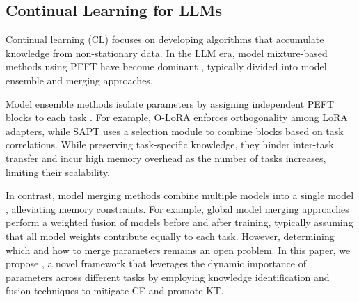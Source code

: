 \subsection{Continual Learning for LLMs}
Continual learning (CL) \cite{zhou2024continual} focuses on developing algorithms that accumulate knowledge from non-stationary data. In the LLM era, model mixture-based methods using PEFT have become dominant \cite{wang2023rehearsal, huang2024mitigating, wang2024inscl}, typically divided into model ensemble and merging approaches.

Model ensemble methods isolate parameters by assigning independent PEFT blocks to each task \cite{feng2023towards, pham2023continual, ke2023sub, li2024revisiting, he2024seekr, wang2024self}. For example, O-LoRA \cite{wang2023orthogonal} enforces orthogonality among LoRA adapters, while SAPT \cite{zhao2024sapt} uses a selection module to combine blocks based on task correlations. 
While preserving task-specific knowledge, they hinder inter-task transfer and incur high memory overhead as the number of tasks increases, limiting their scalability.

In contrast, model merging methods combine multiple models into a single model \cite{cheng2024dam, alexandrov2024mitigating, ren2024analyzing}, alleviating memory constraints.
For example, global model merging approaches \cite{wortsman2022model, ilharco2023editing} perform a weighted fusion of models before and after training, typically assuming that all model weights contribute equally to each task.
However, determining which and how to merge parameters remains an open problem.
In this paper, we propose {\ouralg}, a novel framework that leverages the dynamic importance of parameters across different tasks by employing knowledge identification and fusion techniques to mitigate CF and promote KT.



